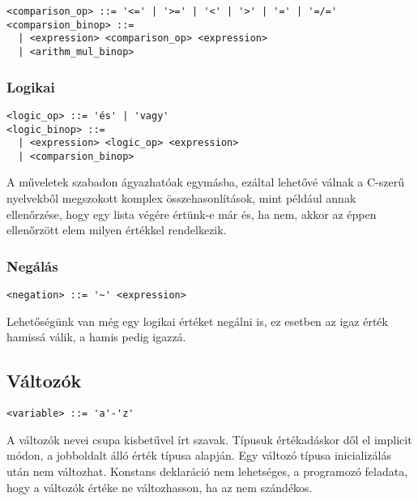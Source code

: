 \begin{footnotesize}
\begin{verbatim}
<comparison_op> ::= '<=' | '>=' | '<' | '>' | '=' | '=/='
<comparsion_binop> ::= 
  | <expression> <comparison_op> <expression>
  | <arithm_mul_binop>
\end{verbatim}
\end{footnotesize}

\subsubsection{Logikai}

\begin{footnotesize}
\begin{verbatim}
<logic_op> ::= 'és' | 'vagy'
<logic_binop> ::= 
  | <expression> <logic_op> <expression> 
  | <comparsion_binop>
\end{verbatim}
\end{footnotesize}


A műveletek szabadon ágyazhatóak egymásba, ezáltal lehetővé válnak a C-szerű nyelvekből megszokott komplex összehasonlítások, mint például annak ellenőrzése, hogy egy lista végére értünk-e már és, ha nem, akkor az éppen ellenőrzött elem milyen értékkel rendelkezik.

\subsubsection{Negálás}

\begin{footnotesize}
\begin{verbatim}
<negation> ::= '~' <expression>
\end{verbatim}
\end{footnotesize}

Lehetőségünk van még egy logikai értéket negálni is, ez esetben az igaz érték hamissá válik, a hamis pedig igazzá.

\subsection{Változók}

\begin{footnotesize}
\begin{verbatim}
<variable> ::= 'a'-'z'
\end{verbatim}
\end{footnotesize}

A változók nevei csupa kisbetűvel írt szavak. Típusuk értékadáskor dől el implicit módon, a jobboldalt álló érték típusa alapján. Egy változó típusa inicializálás után nem változhat. Konstans deklaráció nem lehetséges, a programozó feladata, hogy a változók értéke ne változhasson, ha az nem szándékos.

